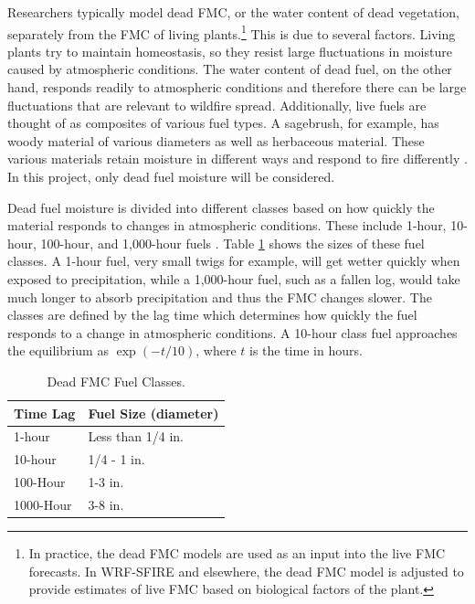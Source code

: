 \documentclass[11pt]{article}%
\begin{document}
Researchers typically model dead FMC, or the water content of dead vegetation, separately from the FMC of living plants.\footnote{In practice, the dead FMC models are used as an input into the live FMC forecasts. In WRF-SFIRE and elsewhere, the dead FMC model is adjusted to provide estimates of live FMC based on biological factors of the plant.} This is due to several factors. Living plants try to maintain homeostasis, so they resist large fluctuations in moisture caused by atmospheric conditions. The water content of dead fuel, on the other hand, responds readily to atmospheric conditions and therefore there can be large fluctuations that are relevant to wildfire spread. Additionally, live fuels are thought of as composites of various fuel types. A sagebrush, for example, has woody material of various diameters as well as herbaceous material. These various materials retain moisture in different ways and respond to fire differently \cite{NWCG-2024-FWP}. In this project, only dead fuel moisture will be considered. 

Dead fuel moisture is divided into different classes based on how quickly the material responds to changes in atmospheric conditions. These include 1-hour, 10-hour, 100-hour, and 1,000-hour fuels \cite{NCEI-2024-DFM}. Table \ref{tab:classes} shows the sizes of these fuel classes. A 1-hour fuel, very small twigs for example, will get wetter quickly when exposed to precipitation, while a 1,000-hour fuel, such as a fallen log, would take much longer to absorb precipitation and thus the FMC changes slower. The classes are defined by the lag time which determines how quickly the fuel responds to a change in atmospheric conditions. A 10-hour class fuel approaches the equilibrium as $\exp(-t/10)$, where $t$ is the time in hours.

\begin{table}[ht]
\centering
\caption{Dead FMC Fuel Classes.}
\label{tab:classes}
\begin{tabular}{|l|l|}
\hline
\textbf{Time Lag}           & \textbf{Fuel Size (diameter)} \\  \hline
1-hour     & Less than 1/4 in.             \\ \hline
10-hour    & 1/4 - 1 in.             \\ \hline
100-Hour   & 1-3 in.\\ \hline
1000-Hour   & 3-8 in.\\ \hline
\hline

\end{tabular}
\end{table}
\end{document}
